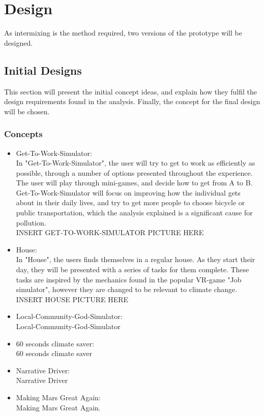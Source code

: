 \chapter{Design}

As intermixing is the method required, two versions of the prototype will be designed.

\section{Initial Designs}
This section will present the initial concept ideas, and explain how they fulfil the design requirements found in the analysis. Finally, the concept for the final design will be chosen.

\subsection{Concepts}

\begin{itemize}
    \item Get-To-Work-Simulator:\\
    In "Get-To-Work-Simulator", the user will try to get to work as efficiently as possible, through a number of options presented throughout the experience. The user will play through mini-games, and decide how to get from A to B. Get-To-Work-Simulator will focus on improving how the individual gets about in their daily lives, and try to get more people to choose bicycle or public transportation, which the analysis explained is a significant cause for pollution.\\
    INSERT GET-TO-WORK-SIMULATOR PICTURE HERE\\
    \item House:\\
    In "House", the users finds themselves in a regular house. As they start their day, they will be presented with a series of tasks for them complete. These tasks are inspired by the mechanics found in the popular VR-game "Job simulator", however they are changed to be relevant to climate change.\\
    INSERT HOUSE PICTURE HERE\\
    \item Local-Community-God-Simulator:\\
    Local-Community-God-Simulator
    \item 60 seconds climate saver:\\
    60 seconds climate saver
    \item Narrative Driver:\\
    Narrative Driver
    \item Making Mars Great Again:\\
    Making Mars Great Again.
\end{itemize}

